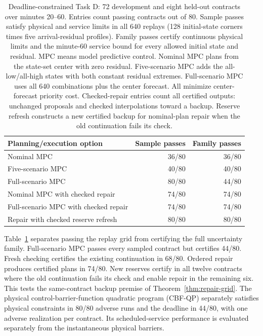 \documentclass[preprint,12pt]{elsarticle}
\begin{document}
\begin{table}[t]
\centering\small
\caption{Deadline-constrained Task D: 72 development and eight held-out
contracts over minutes 20--60. Entries count passing contracts out of 80.
Sample passes satisfy physical and service limits in all 640 replays
(128 initial-state corners times five arrival-residual profiles).
Family passes certify continuous physical limits and the minute-60 service
bound for every allowed initial state and residual. MPC means model predictive control.
Nominal MPC plans from the state-set center with zero residual.
Five-scenario MPC adds the all-low/all-high states with both constant
residual extremes. Full-scenario MPC uses all 640 combinations plus the
center forecast. All minimize center-forecast priority cost. Checked-repair
entries count all certified outputs: unchanged proposals and checked
interpolations toward a backup. Reserve refresh constructs a new certified
backup for nominal-plan repair when the old continuation fails its check.}
\label{tab:benchmark-deadlines}
\begin{tabular}{@{}lrr@{}}
\toprule
Planning/execution option & Sample passes & Family passes\\
\midrule
Nominal MPC & 36/80 & 36/80\\
Five-scenario MPC & 40/80 & 40/80\\
Full-scenario MPC & 80/80 & 44/80\\
Nominal MPC with checked repair & 74/80 & 74/80\\
Full-scenario MPC with checked repair & 74/80 & 74/80\\
Repair with checked reserve refresh & 80/80 & 80/80\\
\bottomrule
\end{tabular}
\end{table}

Table~\ref{tab:benchmark-deadlines} separates passing the replay grid from
certifying the full uncertainty family. Full-scenario MPC passes every
sampled contract but certifies 44/80. Fresh checking certifies the existing
continuation in 68/80. Ordered repair produces certified plans in 74/80.
New reserves certify in all twelve contracts where the old continuation
fails its check and enable repair in the remaining six. This tests the
same-contract backup premise of Theorem~\ref{thm:repair-grid}.
The physical control-barrier-function quadratic program (CBF-QP)
separately satisfies physical constraints in 80/80
adverse runs and the deadline in 44/80, with one adverse realization per
contract. Its scheduled-service performance is evaluated separately from the
instantaneous physical barriers.
\end{document}
